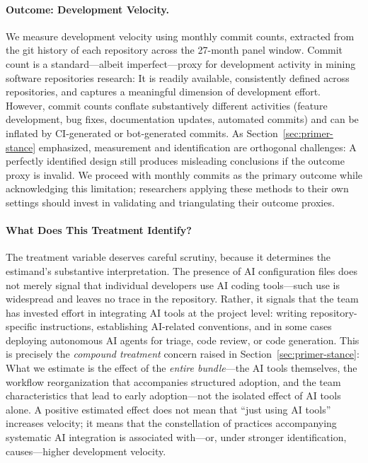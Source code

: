 \paragraph{Outcome: Development Velocity.}
We measure development velocity using monthly commit counts, extracted from the git history of each repository across the 27-month panel window.
Commit count is a standard---albeit imperfect---proxy for development activity in mining software repositories research: It is readily available, consistently defined across repositories, and captures a meaningful dimension of development effort.
However, commit counts conflate substantively different activities (feature development, bug fixes, documentation updates, automated commits) and can be inflated by CI-generated or bot-generated commits.
As Section~\ref{sec:primer-stance} emphasized, measurement and identification are orthogonal challenges: A perfectly identified design still produces misleading conclusions if the outcome proxy is invalid.
We proceed with monthly commits as the primary outcome while acknowledging this limitation; researchers applying these methods to their own settings should invest in validating and triangulating their outcome proxies.

\paragraph{What Does This Treatment Identify?}
The treatment variable deserves careful scrutiny, because it determines the estimand's substantive interpretation.
The presence of AI configuration files does not merely signal that individual developers use AI coding tools---such use is widespread and leaves no trace in the repository.
Rather, it signals that the team has invested effort in integrating AI tools at the project level: writing repository-specific instructions, establishing AI-related conventions, and in some cases deploying autonomous AI agents for triage, code review, or code generation.
This is precisely the \emph{compound treatment} concern raised in Section~\ref{sec:primer-stance}: What we estimate is the effect of the \emph{entire bundle}---the AI tools themselves, the workflow reorganization that accompanies structured adoption, and the team characteristics that lead to early adoption---not the isolated effect of AI tools alone.
A positive estimated effect does not mean that ``just using AI tools'' increases velocity; it means that the constellation of practices accompanying systematic AI integration is associated with---or, under stronger identification, causes---higher development velocity.

